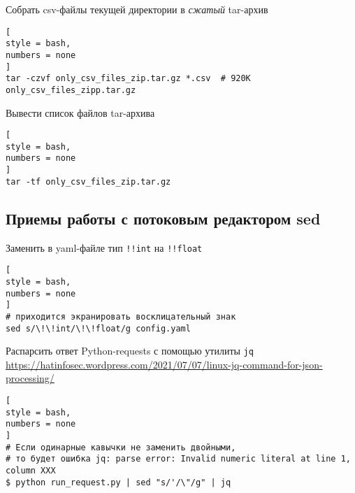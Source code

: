 \documentclass[%
	11pt,
	a4paper,
	utf8,
		]{article}
\begin{document}
Собрать csv-файлы текущей директории в \emph{сжатый} tar-архив 
\begin{lstlisting}[
style = bash,
numbers = none	
]
tar -czvf only_csv_files_zip.tar.gz *.csv  # 920K	only_csv_files_zipp.tar.gz
\end{lstlisting}

Вывести список файлов tar-архива
\begin{lstlisting}[
style = bash,
numbers = none	
]
tar -tf only_csv_files_zip.tar.gz
\end{lstlisting}

\subsection{Приемы работы с потоковым редактором sed}

Заменить в yaml-файле тип \verb|!!int| на \verb|!!float|
\begin{lstlisting}[
style = bash,
numbers = none	
]
# приходится экранировать восклицательный знак
sed s/\!\!int/\!\!float/g config.yaml
\end{lstlisting}

Распарсить ответ Python-requests с помощью утилиты \verb*|jq| \url{https://hatinfosec.wordpress.com/2021/07/07/linux-jq-command-for-json-processing/}
\begin{lstlisting}[
style = bash,
numbers = none
]
# Если одинарные кавычки не заменить двойными,
# то будет ошибка jq: parse error: Invalid numeric literal at line 1, column XXX
$ python run_request.py | sed "s/'/\"/g" | jq
\end{lstlisting}



\begin{thebibliography}{99}
	
	
\end{thebibliography}

\end{document}
